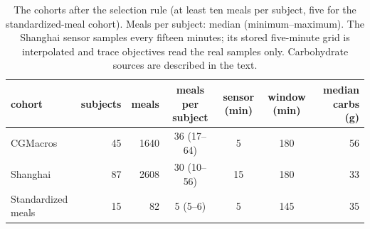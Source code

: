\begin{table}[t]
\centering\small
\begin{tabular}{lrrcccr}
\toprule
cohort & subjects & meals & meals per subject & sensor (min) & window (min) & median carbs (g) \\
\midrule
CGMacros & 45 & 1640 & 36 (17--64) & 5 & 180 & 56 \\
Shanghai & 87 & 2608 & 30 (10--56) & 15 & 180 & 33 \\
Standardized meals & 15 & 82 & 5 (5--6) & 5 & 145 & 35 \\
\bottomrule
\end{tabular}
\caption{The cohorts after the selection rule (at least ten meals per subject, five for the standardized-meal cohort). Meals per subject: median (minimum--maximum). The Shanghai sensor samples every fifteen minutes; its stored five-minute grid is interpolated and trace objectives read the real samples only. Carbohydrate sources are described in the text.}
\label{tab:cohorts}
\end{table}
